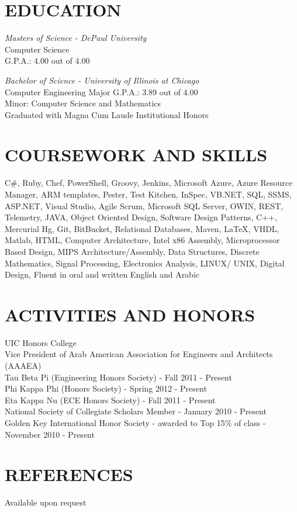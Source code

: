 \documentclass[margin]{res}
\begin{document}
\begin{resume}
\section{EDUCATION} 
{\sl Masters of Science - DePaul University} \\
	Computer Science\\
	G.P.A.: 4.00 out of 4.00

{\sl Bachelor of Science - University of Illinois at Chicago} \\
	Computer Engineering Major G.P.A.: 3.89 out of 4.00\\
	Minor: Computer Science and Mathematics \\
	Graduated with Magna Cum Laude Institutional Honors
                
\section{COURSEWORK AND SKILLS}  C\#, Ruby, Chef, PowerShell, Groovy, Jenkins, Microsoft Azure, Azure Resource Manager, ARM templates, Pester, Test Kitchen, InSpec, VB.NET, SQL, SSMS, ASP.NET, Visual Studio, Agile Scrum, Microsoft SQL Server, OWIN, REST, Telemetry, JAVA, Object Oriented Design, Software Design Patterns, C++, Mercurial Hg, Git, BitBucket, Relational Databases, Maven, LaTeX, VHDL, Matlab,  HTML, Computer Architecture, Intel x86 Assembly, Microprocessor Based Design, MIPS Architecture/Assembly, Data Structures, Discrete Mathematics, Signal Processing, Electronics Analysis, LINUX/ UNIX, Digital Design, Fluent in oral and written English and Arabic

\section{ACTIVITIES AND HONORS} 
	UIC Honors College\\
	Vice President of Arab American Association for Engineers and Architects (AAAEA) \\
	Tau Beta Pi (Engineering Honors Society) - Fall 2011 - Present \\
	Phi Kappa Phi (Honors Society) - Spring 2012 - Present \\
	Eta Kappa Nu (ECE Honors Society) - Fall 2011 - Present  \\          
	National Society of Collegiate Scholars Member - January 2010 - Present \\
	Golden Key International Honor Society - awarded to Top 15\% of class - November 2010 - Present 
                
\section{REFERENCES}  
	     Available upon request
\end{resume}
\end{document}
